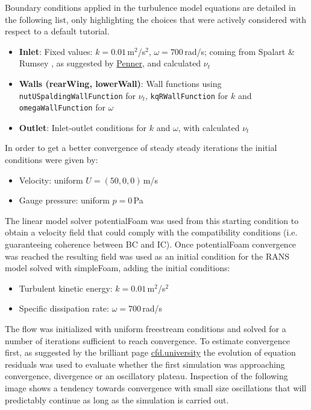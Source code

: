 \documentclass[12pt,a4paper]{article}
\begin{document}
Boundary conditions applied in the turbulence model equations are detailed in the following list, only highlighting the choices that were actively considered with respect to a default tutorial.

\begin{itemize}
    \item \textbf{Inlet}: Fixed values: $k = 0.01$\,m$^2$/s$^2$, $\omega = 700$\,rad/s; coming from Spalart \& Rumsey \cite{spalart2007}, as suggested by \href{https://www.linkedin.com/pulse/simulating-williams-fw43bar-part-1-all-simulations-wrong-david-penner/}{Penner}, and calculated $\nu_t$
    \item \textbf{Walls (rearWing, lowerWall)}: Wall functions using \texttt{nutUSpaldingWallFunction} for $\nu_t$, \texttt{kqRWallFunction} for $k$ and \texttt{omegaWallFunction} for $\omega$
    \item \textbf{Outlet}: Inlet-outlet conditions for $k$ and $\omega$, with calculated $\nu_t$
\end{itemize}

In order to get a better convergence of steady steady iterations the initial conditions were given by:

\begin{itemize}
    \item Velocity: uniform $U = (50, 0, 0)$\,m/s
    \item Gauge pressure: uniform $p = 0$\,Pa
\end{itemize}

The linear model solver potentialFoam was used from this starting condition to obtain a velocity field that could comply with the compatibility conditions (i.e. guaranteeing coherence between BC and IC). Once potentialFoam convergence was reached the resulting field was used as an initial condition for the RANS model solved with simpleFoam, adding the initial conditions:

\begin{itemize}
    \item Turbulent kinetic energy: $k = 0.01$\,m$^2$/s$^2$
    \item Specific dissipation rate: $\omega = 700$\,rad/s
\end{itemize}

The flow was initialized with uniform freestream conditions and solved for a number of iterations sufficient to reach convergence. To estimate convergence first, as suggested by the brilliant page \href{https://cfd.university/blog//how-to-determine-the-best-stopping-criterion-for-cfd-simulations}{cfd.university} the evolution of equation residuals was used to evaluate whether the first simulation was approaching convergence, divergence or an oscillatory plateau. Inspection of the following image shows a tendency towards convergence with small size oscillations that will predictably continue as long as the simulation is carried out.
\end{document}
